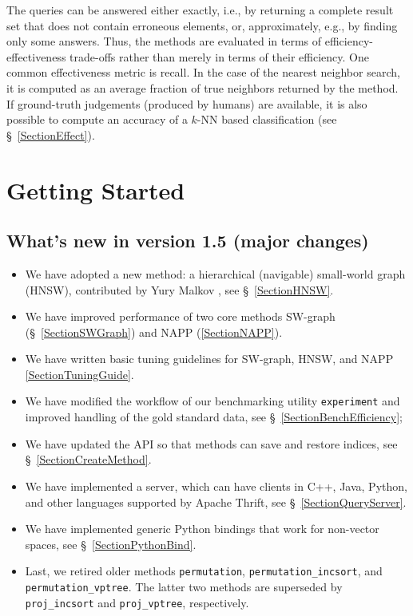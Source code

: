 \documentclass[runningheads,a4paper]{llncs}
\newcommand{\ttt}[1]{\texttt{#1}}
\newcommand{\knn}{$k$-NN }
\newcommand{\LibVersion}{1.5}
\begin{document}
{The queries can be answered either exactly, 
i.e., by returning a complete result set that does not contain erroneous elements, or, 
approximately, e.g., by finding only some answers.
Thus, the methods are evaluated in terms of efficiency-effectiveness trade-offs
rather than merely in terms of their efficiency.
One common effectiveness metric is recall. In the case
of the nearest neighbor search, it is computed as
an average fraction of true neighbors returned by the method.
If ground-truth judgements (produced by humans) are available,
it is also possible to compute an accuracy of a \knn based classification
(see \S~\ref{SectionEffect}).


\section{Getting Started}

\subsection{What's new in version \LibVersion{} (major changes)} 
\begin{itemize}
\item We have adopted a new method: a hierarchical (navigable) small-world graph (HNSW),
      contributed by Yury Malkov \cite{Malkov2016}, see \S~\ref{SectionHNSW}.
\item We have improved performance of two core methods SW-graph (\S~\ref{SectionSWGraph}) and NAPP (\ref{SectionNAPP}).
\item We have written basic tuning guidelines for SW-graph, HNSW, and NAPP \ref{SectionTuningGuide}.
\item We have modified the workflow of our benchmarking utility \ttt{experiment}
and improved handling of the gold standard data, see \S~\ref{SectionBenchEfficiency};
\item We have updated the API so that methods can save and restore indices, see \S~\ref{SectionCreateMethod}.
\item We have implemented a server, which can have clients in C++, Java, Python, and other languages supported by Apache Thrift, see \S~\ref{SectionQueryServer}. 
\item We have implemented generic Python bindings that work for non-vector spaces, see \S~\ref{SectionPythonBind}.
\item Last, we retired older methods \ttt{permutation}, \ttt{permutation\_incsort}, and \ttt{permutation\_vptree}. 
The latter two methods are superseded by \ttt{proj\_incsort} and \ttt{proj\_vptree}, respectively.
\end{itemize}

}
\end{document}
